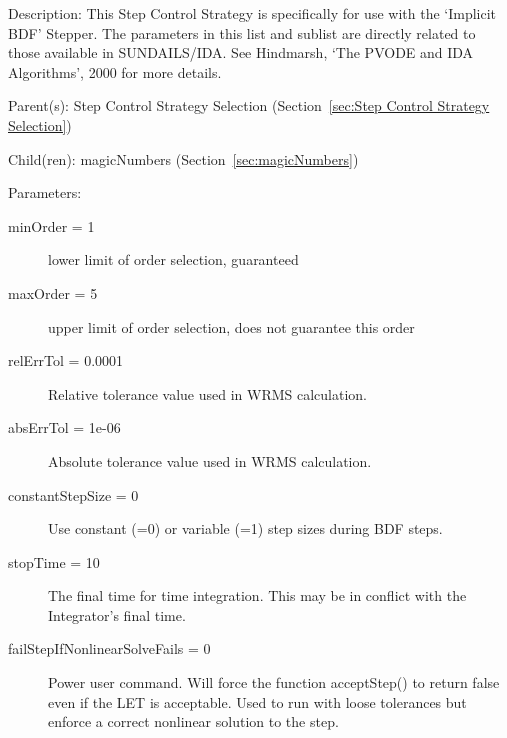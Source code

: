 \begin{list}{}
  {\setlength{\leftmargin}{1.0in}
   \setlength{\labelwidth}{0.75in}
   \setlength{\labelsep}{0.125in}}
  \item[Description:]
    This Step Control Strategy is specifically for use with the `Implicit BDF' Stepper.  The parameters in this list and sublist are directly related to those available in SUNDAILS/IDA.  See Hindmarsh, `The PVODE and IDA Algorithms', 2000 for more details.
  \item[Parent(s):]
    Step Control Strategy Selection (Section~\ref{sec:Step Control Strategy Selection})
  \item[Child(ren):]
    magicNumbers (Section~\ref{sec:magicNumbers})
  \item[Parameters:]
    \begin{description}
      \item[minOrder = 1] 
lower limit of order selection, guaranteed
      \item[maxOrder = 5] 
upper limit of order selection, does not guarantee this order
      \item[relErrTol = 0.0001] 
Relative tolerance value used in WRMS calculation.
      \item[absErrTol = 1e-06] 
Absolute tolerance value used in WRMS calculation.
      \item[constantStepSize = 0] 
Use constant (=0) or variable (=1) step sizes during BDF steps.
      \item[stopTime = 10] 
The final time for time integration.  This may be in conflict with the Integrator's final time.
      \item[failStepIfNonlinearSolveFails = 0] 
Power user command. Will force the function acceptStep() to return false even if the LET is acceptable.  Used to run with loose tolerances but enforce a correct nonlinear solution to the step.
\end{description}

\end{list}

